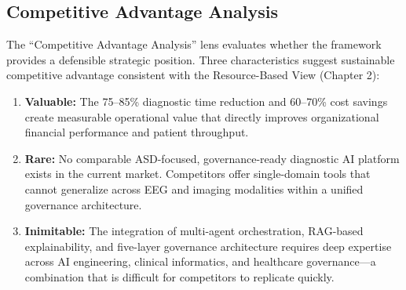 \subsection{Competitive Advantage Analysis}

The ``Competitive Advantage Analysis'' lens evaluates whether the framework provides a defensible strategic position. Three characteristics suggest sustainable competitive advantage consistent with the Resource-Based View (Chapter 2):

\begin{enumerate}
    \item \textbf{Valuable:} The 75--85\% diagnostic time reduction and 60--70\% cost savings create measurable operational value that directly improves organizational financial performance and patient throughput.

    \item \textbf{Rare:} No comparable ASD-focused, governance-ready diagnostic AI platform exists in the current market. Competitors offer single-domain tools that cannot generalize across EEG and imaging modalities within a unified governance architecture.

    \item \textbf{Inimitable:} The integration of multi-agent orchestration, RAG-based explainability, and five-layer governance architecture requires deep expertise across AI engineering, clinical informatics, and healthcare governance---a combination that is difficult for competitors to replicate quickly.
\end{enumerate}

